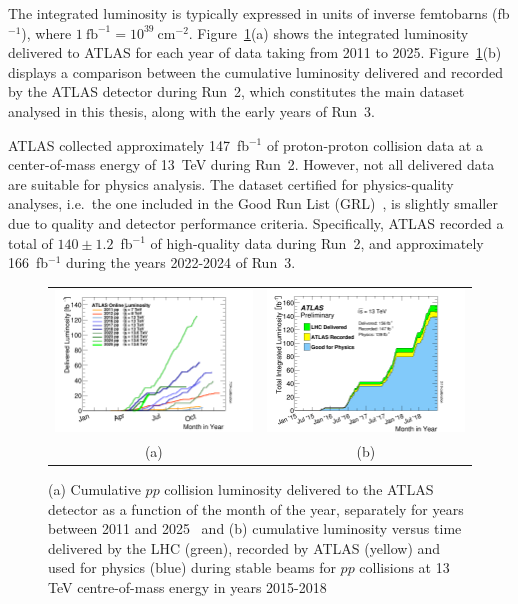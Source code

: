 The integrated luminosity is typically expressed in units of inverse femtobarns (fb$^{-1}$), where $1~\text{fb}^{-1} = 10^{39}~\text{cm}^{-2}$. Figure~\ref{figure:Run3lumi}(a) shows the integrated luminosity delivered to ATLAS for each year of data taking from 2011 to 2025. Figure~\ref{figure:Run3lumi}(b) displays a comparison between the cumulative luminosity delivered and recorded by the ATLAS detector during Run~2, which constitutes the main dataset analysed in this thesis, along with the early years of Run~3.

ATLAS collected approximately 147~fb$^{-1}$ of proton-proton collision data at a center-of-mass energy of 13~TeV during Run~2. However, not all delivered data are suitable for physics analysis. The dataset certified for physics-quality analyses, i.e.\ the one included in the Good Run List (GRL)~\cite{Aad_2020}, is slightly smaller due to quality and detector performance criteria. Specifically, ATLAS recorded a total of $140 \pm 1.2$~fb$^{-1}$ of high-quality data during Run~2, and approximately 166~fb$^{-1}$ during the years 2022-2024 of Run~3.

\begin{figure}[htbp]
\centering
\begin{tabular}{cc}
    \includegraphics[width=0.5\linewidth]{images/intlumivsyear.png} &
    \includegraphics[width=0.5\linewidth]{images/intlumivstimeRun2DQall.png} \\
    (a) & (b)  \\
\end{tabular}
\caption{(a) Cumulative $pp$ collision luminosity delivered to the ATLAS detector as a function of the month
of the year, separately for years between 2011 and 2025~\cite{atlas:Run3lumi} and (b) cumulative luminosity versus
time delivered by the LHC (green), recorded by ATLAS (yellow) and used for physics (blue)
during stable beams for $pp$ collisions at 13 TeV centre-of-mass energy in years 2015-2018~\cite{atlas:Run2lumi}}
\label{figure:Run3lumi}
\end{figure}

